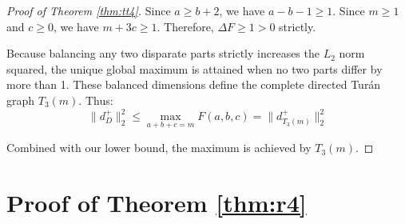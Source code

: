 \documentclass[a4paper]{amsart}
\begin{document}
\begin{proof}[Proof of Theorem \ref{thm:tt4}]
Since $a \ge b + 2$, we have $a - b - 1 \ge 1$.
Since $m \ge 1$ and $c \ge 0$, we have $m + 3c \ge 1$.
Therefore, $\Delta F \ge 1 > 0$ strictly.

Because balancing any two disparate parts strictly increases the $L_2$ norm squared, the unique global maximum is attained when no two parts differ by more than 1.
These balanced dimensions define the complete directed Tur\'an graph $T_3(m)$.
Thus:
\[
\|d^+_D\|_2^2 \le \max_{a+b+c=m} F(a,b,c) = \|d^+_{T_3(m)}\|_2^2
\]

Combined with our lower bound, the maximum is achieved by $T_3(m)$.
\end{proof}



\section{Proof of Theorem \ref{thm:r4}}
\end{document}
